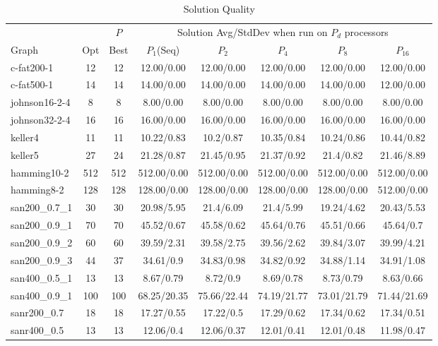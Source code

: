 \documentclass[11pt]{article}
\begin{document}
\linespread{1}
\begin{table*}[ht!]
\caption{Solution Quality\label{tab:spar_table}}
\begin{footnotesize}
\begin{center}
\begin{tabular}{|l||c|c||c|c|c|c|c|}
\hline%
&&$P$& \multicolumn{5}{|c|}{Solution Avg/StdDev when run on $P_d$ processors}\\
\cline{4-8}
Graph &Opt & Best      &$P_1$(Seq)  &$P_2$ &$P_4$   &$P_8$    &$P_{16}$\\
\hline											            				       
c-fat200-1 	&12 &12	   &12.00/0.00 &12.00/0.00 &12.00/0.00 &12.00/0.00 &12.00/0.00\\
c-fat500-1 	&14 &14	   &14.00/0.00 &14.00/0.00 &14.00/0.00 &14.00/0.00 &12.00/0.00\\
johnson16-2-4 	&8 	&8 	   &8.00/0.00 &8.00/0.00 &8.00/0.00 &8.00/0.00 &8.00/0.00\\
johnson32-2-4 	&16 &16    &16.00/0.00 &16.00/0.00 &16.00/0.00 &16.00/0.00 &16.00/0.00\\
\hline 
keller4 &11 &11 	&10.22/0.83 &10.2/0.87 &10.35/0.84 &10.24/0.86 &10.44/0.82\\
keller5 &27 &24     &21.28/0.87 &21.45/0.95 &21.37/0.92 &21.4/0.82 &21.46/8.89\\
hamming10-2 &512 &512 &512.00/0.00 &512.00/0.00 &512.00/0.00 &512.00/0.00 &512.00/0.00\\
hamming8-2 	&128 &128 &128.00/0.00 &128.00/0.00 &128.00/0.00 &128.00/0.00 &512.00/0.00\\
\hline
san200\_0.7\_1 	&30 &30 &20.98/5.95 &21.4/6.09 &21.4/5.99 &19.24/4.62 &20.43/5.53\\
san200\_0.9\_1 	&70 &70 &45.52/0.67 &45.58/0.62 &45.64/0.76 &45.51/0.66 &45.64/0.7\\
san200\_0.9\_2 	&60 &60 &39.59/2.31 &39.58/2.75 &39.56/2.62 &39.84/3.07 &39.99/4.21\\
san200\_0.9\_3 	&44 &37 &34.61/0.9 &34.83/0.98 &34.82/0.92 &34.88/1.14 &34.91/1.08\\
san400\_0.5\_1 	&13 &13 &8.67/0.79 &8.72/0.9 &8.69/0.78 &8.73/0.79 &8.63/0.66\\
san400\_0.9\_1 	&100 &100 &68.25/20.35 &75.66/22.44 &74.19/21.77 &73.01/21.79 &71.44/21.69\\
\hline
sanr200\_0.7 	&18 &18  &17.27/0.55 &17.22/0.5 &17.29/0.62 &17.34/0.62 &17.34/0.51\\
sanr400\_0.5 	&13 &13  &12.06/0.4 &12.06/0.37 &12.01/0.41 &12.01/0.48 &11.98/0.47\\

\end{tabular}
\end{center}
\end{footnotesize}
\end{table*}
\end{document}
